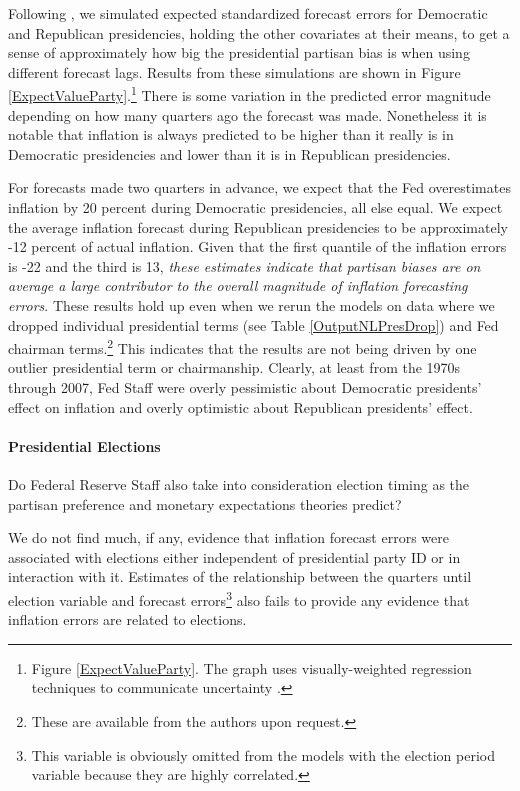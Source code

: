 \documentclass[a4paper]{article}\usepackage[]{graphicx}\usepackage[]{color}
\begin{document}
Following \cite{King2000}, we simulated expected standardized forecast errors for Democratic and Republican presidencies, holding the other covariates at their means, to get a sense of approximately how big the presidential partisan bias is when using different forecast lags. Results from these simulations are shown in Figure \ref{ExpectValueParty}.\footnote{Figure \ref{ExpectValueParty}. The graph uses visually-weighted regression techniques to communicate uncertainty \citep[see][]{Hsiang2012,Gandrud2013visual}.} There is some variation in the predicted error magnitude depending on how many quarters ago the forecast was made. Nonetheless it is notable that inflation is always predicted to be higher than it really is in Democratic presidencies and lower than it is in Republican presidencies.

For forecasts made two quarters in advance, we expect that the Fed overestimates inflation by 20 percent during Democratic presidencies, all else equal. We expect the average inflation forecast during Republican presidencies to be approximately -12 percent of actual inflation. Given that the first quantile of the inflation errors is -22 and the third is 13, \emph{these estimates indicate that partisan biases are on average a large contributor to the overall magnitude of inflation forecasting errors}. These results hold up even when we rerun the models on data where we dropped individual presidential terms (see Table \ref{OutputNLPresDrop}) and Fed chairman terms.\footnote{These are available from the authors upon request.} This indicates that the results are not being driven by one outlier presidential term or chairmanship. Clearly, at least from the 1970s through 2007, Fed Staff were overly pessimistic about Democratic presidents' effect on inflation and overly optimistic about Republican presidents' effect. 

\paragraph{Presidential Elections}

Do Federal Reserve Staff also take into consideration election timing as the partisan preference and monetary expectations theories predict? 

We do not find much, if any, evidence that inflation forecast errors were associated with elections either independent of presidential party ID or in interaction with it. Estimates of the relationship between the quarters until election variable and forecast errors\footnote{This variable is obviously omitted from the models with the election period variable because they are highly correlated.} also fails to provide any evidence that inflation errors are related to elections. 
\end{document}
